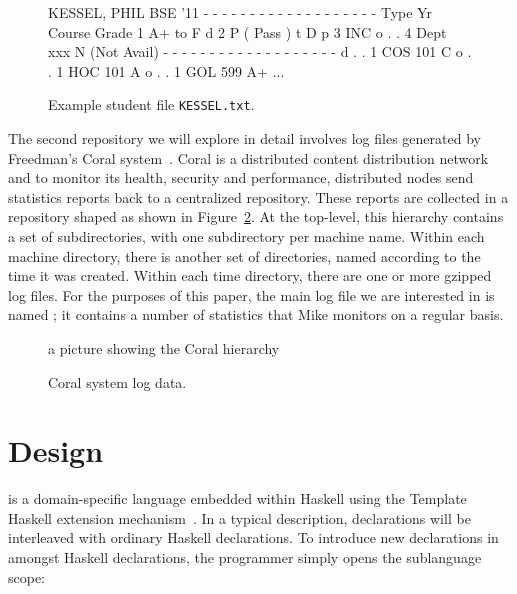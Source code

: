\documentclass[natbib]{sigplanconf}
\begin{document}
\begin{figure}
\begin{code}
KESSEL, PHIL	   BSE   '11
- - - - - - - - - - - - - - - - - - -
Type    Yr  Course     Grade
         1             A+ to F
d        2             P  (  Pass )
t  D  p  3             INC
o  .  .  4  Dept  xxx  N  (Not Avail)
- - - - - - - - - - - - - - - - - - -
d  .  .  1  COS   101  C
o  .  .  1  HOC   101  A
o  .  .  1  GOL   599  A+
...
\end{code}
\caption{Example student file {\tt KESSEL.txt}.}
\label{fig:student-file-example}
\end{figure}

The second repository we will explore in detail involves
log files generated by Freedman's Coral system~\cite{freedman+:coral,freedman:coral-experience}.  Coral is a distributed content distribution network and
to monitor its health, security and performance, distributed nodes send
statistics reports back to a centralized repository.  These reports
are collected in a repository shaped as shown in Figure~\ref{fig:coral-pic}.
At the top-level, this hierarchy contains a set of subdirectories, with
one subdirectory per machine name.  Within each machine directory, there is 
another set of directories, named according to the time it was created.
Within each time directory, there are one or more gzipped log files.
For the purposes of this paper, the main log file we are interested 
in is named ; it contains a number of statistics
that Mike monitors on a regular basis. 

\begin{figure}

a picture showing the Coral hierarchy

\caption{Coral system log data.}
\label{fig:coral-pic}
\end{figure}

\section{\forest{} Design}
\label{sec:review}

\forest{} is a domain-specific language embedded within Haskell using the
Template Haskell extension mechanism~\cite{metahaskell}.  In a typical
\forest{} description, \forest{} declarations will be interleaved with ordinary
Haskell declarations.  To introduce new \forest{} declarations in amongst
Haskell declarations,
the programmer simply opens the \forest{} sublanguage scope:
\begin{code}
\end{code}
\end{document}
